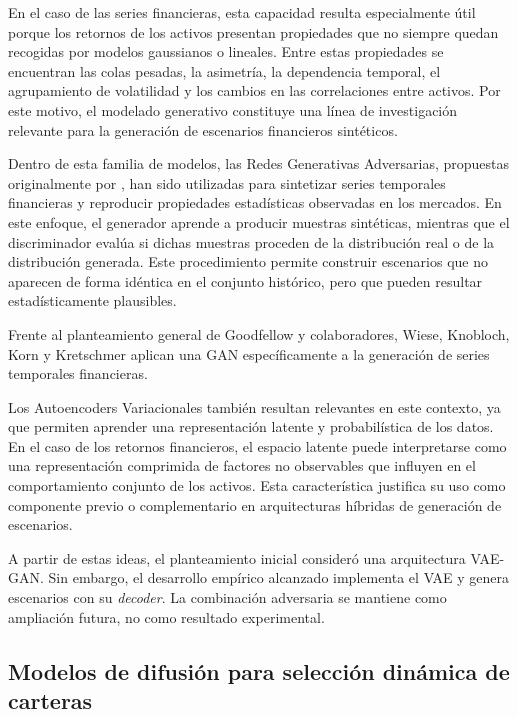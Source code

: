 En el caso de las series financieras, esta capacidad resulta especialmente útil porque los retornos de los activos presentan propiedades que no siempre quedan recogidas por modelos gaussianos o lineales. Entre estas propiedades se encuentran las colas pesadas, la asimetría, la dependencia temporal, el agrupamiento de volatilidad y los cambios en las correlaciones entre activos. Por este motivo, el modelado generativo constituye una línea de investigación relevante para la generación de escenarios financieros sintéticos.

Dentro de esta familia de modelos, las Redes Generativas Adversarias, propuestas originalmente por \cite{goodfellow2014generative}, han sido utilizadas para sintetizar series temporales financieras y reproducir propiedades estadísticas observadas en los mercados. En este enfoque, el generador aprende a producir muestras sintéticas, mientras que el discriminador evalúa si dichas muestras proceden de la distribución real o de la distribución generada. Este procedimiento permite construir escenarios que no aparecen de forma idéntica en el conjunto histórico, pero que pueden resultar estadísticamente plausibles.

Frente al planteamiento general de Goodfellow y colaboradores, Wiese, Knobloch, Korn y Kretschmer \citeyear{wiese2020quantgans} aplican una GAN específicamente a la generación de series temporales financieras.

Los Autoencoders Variacionales también resultan relevantes en este contexto, ya que permiten aprender una representación latente y probabilística de los datos. En el caso de los retornos financieros, el espacio latente puede interpretarse como una representación comprimida de factores no observables que influyen en el comportamiento conjunto de los activos. Esta característica justifica su uso como componente previo o complementario en arquitecturas híbridas de generación de escenarios.

A partir de estas ideas, el planteamiento inicial consideró una arquitectura VAE-GAN. Sin embargo, el desarrollo empírico alcanzado implementa el VAE y genera escenarios con su \textit{decoder}. La combinación adversaria se mantiene como ampliación futura, no como resultado experimental.

\subsection{Modelos de difusión para selección dinámica de carteras}

